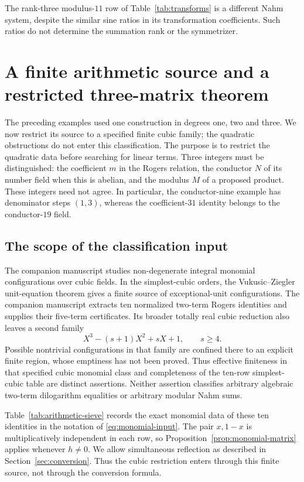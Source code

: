 \documentclass[11pt,reqno]{amsart}
\theoremstyle{remark}
\numberwithin{equation}{section}
\begin{document}
The rank-three modulus-$11$ row of Table~\ref{tab:transforms}
is a different Nahm system, despite the similar sine ratios in its
transformation coefficients. Such ratios do not determine the
summation rank or the symmetrizer.

\section{A finite arithmetic source and a restricted three-matrix theorem}
\label{sec:sieve}
The preceding examples used one construction in degrees one, two and
three. We now restrict its source to a specified finite cubic family;
the quadratic obstructions do not enter this classification. The purpose
is to restrict the quadratic data before searching for linear terms.
Three integers must be distinguished:
the coefficient $m$ in the Rogers relation, the conductor $N$ of its
number field when this is abelian, and the modulus $M$ of a proposed
product. These integers need not agree. In particular, the conductor-nine
example has denominator steps $(1,3)$, whereas the coefficient-$31$
identity belongs to the conductor-$19$ field.

\subsection{The scope of the classification input}
The companion manuscript \cite{CubicClassification} studies non-degenerate
integral monomial configurations over cubic fields. In the simplest-cubic
orders, the Vukusic--Ziegler unit-equation theorem \cite{VZ} gives a finite
source of exceptional-unit configurations. The companion manuscript
extracts ten normalized two-term Rogers identities and supplies their
five-term certificates. Its broader totally real cubic reduction also
leaves a second family
\[
 X^3-(s+1)X^2+sX+1,\qquad s\geq4.
\]
Possible nontrivial configurations in that family are confined there to
an explicit finite region, whose emptiness has not been proved.
Thus effective finiteness in that specified cubic monomial class and
completeness of the ten-row simplest-cubic table are distinct assertions.
Neither assertion classifies arbitrary algebraic two-term dilogarithm
equalities or arbitrary modular Nahm sums.

Table~\ref{tab:arithmetic-sieve} records the exact monomial data of
these ten identities in the notation of \eqref{eq:monomial-input}.
The pair $x,1-x$ is multiplicatively independent in each row, so
Proposition~\ref{prop:monomial-matrix} applies whenever $h\ne0$.
We allow simultaneous reflection as described in
Section~\ref{sec:conversion}. Thus the cubic restriction enters through
this finite source, not through the conversion formula.
\end{document}
